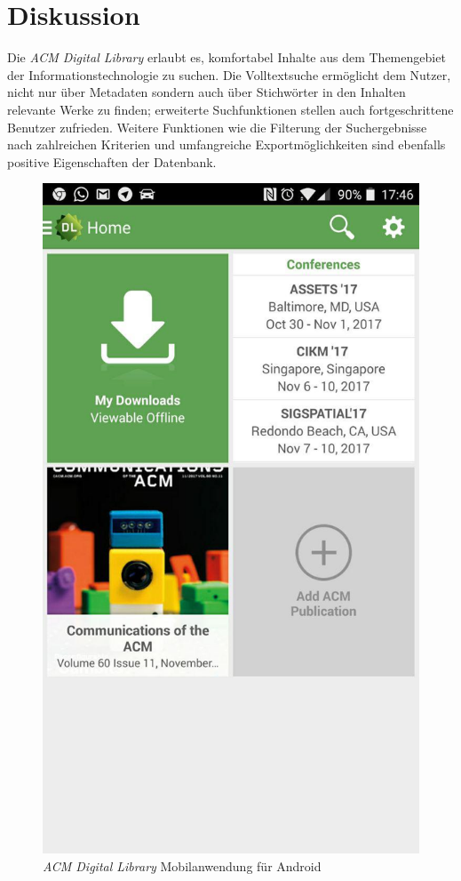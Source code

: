 \documentclass[
	ngerman,
	parskip=half,
	headsepline,
	fontsize=12pt,
	DIV=13,
	listof=leveldown,
	]{scrreprt}
\begin{document}
	\chapter{Diskussion}	
	
	Die \textsl{ACM Digital Library} erlaubt es, komfortabel Inhalte aus dem Themengebiet der Informationstechnologie zu suchen. Die Volltextsuche ermöglicht dem Nutzer, nicht nur über Metadaten sondern auch über Stichwörter in den Inhalten relevante Werke zu finden; erweiterte Suchfunktionen stellen auch fortgeschrittene Benutzer zufrieden. Weitere Funktionen wie die Filterung der Suchergebnisse nach zahlreichen Kriterien und umfangreiche Exportmöglichkeiten sind ebenfalls positive Eigenschaften der Datenbank. 
	
	\begin{figure}
		\centering
		\includegraphics[width=\linewidth]{img/acmapp.jpg}
		\caption{\textit{ACM Digital Library} Mobilanwendung für Android}
		\label{img:acmapp}
	\end{figure}
\end{document}
